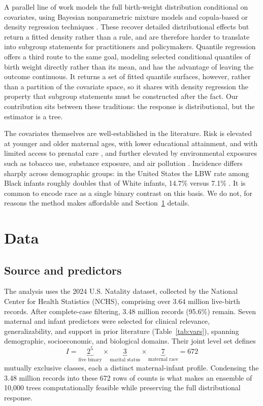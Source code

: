 \documentclass[AMA]{USG}
\begin{document}
A parallel line of work models the full birth-weight distribution conditional on covariates, using Bayesian nonparametric mixture models \cite{dunson2008} and copula-based or density regression techniques \cite{rathjens2023}. These recover detailed distributional effects but return a fitted density rather than a rule, and are therefore harder to translate into subgroup statements for practitioners and policymakers. Quantile regression offers a third route to the same goal, modeling selected conditional quantiles of birth weight directly rather than its mean, and has the advantage of leaving the outcome continuous. It returns a set of fitted quantile surfaces, however, rather than a partition of the covariate space, so it shares with density regression the property that subgroup statements must be constructed after the fact. Our contribution sits between these traditions: the response is distributional, but the estimator is a tree. 

The covariates themselves are well-established in the literature. Risk is elevated at younger and older maternal ages, with lower educational attainment, and with limited access to prenatal care \cite{age_differences_lbw, finch2003, jain2024}, and further elevated by environmental exposures such as tobacco use, substance exposure, and air pollution \cite{standford_med_lbw, lu2020combined}. Incidence differs sharply across demographic groups: in the United States the LBW rate among Black infants roughly doubles that of White infants, 14.7\% versus 7.1\% \cite{marchofdimes2024,kff2026}. It is common to encode race as a single binary contrast on this basis. We do not, for reasons the method makes affordable and Section~\ref{sec:data} details.


\section{Data}
\label{sec:data}
\subsection{Source and predictors}
The analysis uses the 2024 U.S. Natality dataset, collected by the National Center for Health Statistics (NCHS), comprising over 3.64 million live-birth records. After complete-case filtering, 3.48 million records (95.6\%) remain. Seven maternal and infant predictors were selected for clinical relevance, generalizability, and support in prior literature (Table~\ref{tab:vars}), spanning demographic, socioeconomic, and biological domains. Their joint level set defines 
\[
    I = \underbrace{2^5}_{\text{five binary}} \times 
        \underbrace{3}_{\text{marital status}} \times
        \underbrace{7}_{\text{maternal race}} 
        = 672
\]
mutually exclusive classes, each a distinct maternal-infant profile. Condensing the 3.48 million records into these 672 rows of counts is what makes an ensemble of 10,000 trees computationally feasible while preserving the full distributional response.
\end{document}
